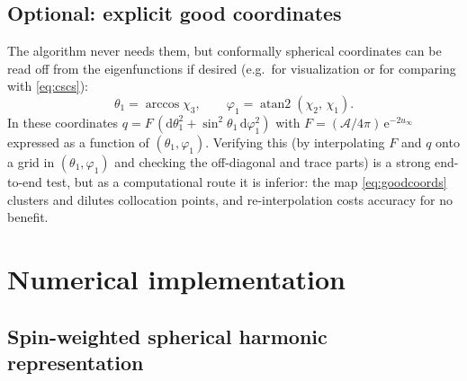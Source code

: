 \documentclass[11pt]{article}
\newcommand{\dd}{\mathrm{d}}
\newcommand{\ee}{\mathrm{e}}
\newcommand{\atantwo}{\operatorname{atan2}}
\begin{document}
\subsection{Optional: explicit good coordinates}
\label{sec:goodcoords}

The algorithm never needs them, but conformally spherical coordinates can be
read off from the eigenfunctions if desired (e.g.\ for visualization or for
comparing with \eqref{eq:cscs}):
\begin{equation}
  \theta_1 = \arccos \chi_3,
  \qquad
  \varphi_1 = \atantwo(\chi_2,\,\chi_1).
  \label{eq:goodcoords}
\end{equation}
In these coordinates $q = F\,(\dd\theta_1^2 +
\sin^2\!\theta_1\,\dd\varphi_1^2)$ with
$F = (\mathcal{A}/4\pi)\,\ee^{-2u_\infty}$ expressed as a function of
$(\theta_1,\varphi_1)$.  Verifying this (by interpolating $F$ and $q$ onto a
grid in $(\theta_1,\varphi_1)$ and checking the off-diagonal and trace parts)
is a strong end-to-end test, but as a computational route it is inferior:
the map \eqref{eq:goodcoords} clusters and dilutes collocation points, and
re-interpolation costs accuracy for no benefit.

\section{Numerical implementation}
\label{sec:numerics}

\subsection{Spin-weighted spherical harmonic representation}
\end{document}
